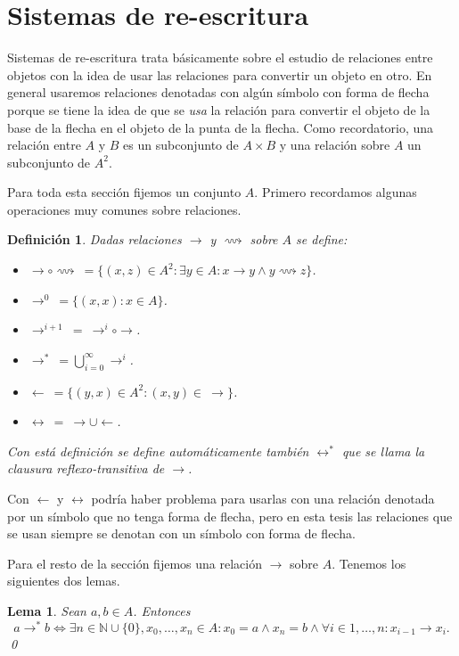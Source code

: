 \documentclass[12pt]{report}
\theoremstyle{customstyle}
\newtheorem{definition}[theorem]{Definición}
\newtheorem{lemma}[theorem]{Lema}
\theoremstyle{factstyle}
\begin{document}
\section{Sistemas de re-escritura}

Sistemas de re-escritura trata básicamente sobre el estudio de relaciones entre objetos con la idea de usar las relaciones para convertir un objeto en otro. En general usaremos relaciones denotadas con algún símbolo con forma de flecha porque se tiene la idea de que se \textsl{usa} la relación para convertir el objeto de la base de la flecha en el objeto de la punta de la flecha. Como recordatorio, una relación entre $A$ y $B$ es un subconjunto de $A × B$ y una relación sobre $A$ un subconjunto de $A^2$.

Para toda esta sección fijemos un conjunto $A$. Primero recordamos algunas operaciones muy comunes sobre relaciones.

\begin{definition}\label{def:operaciones relaciones}
  Dadas relaciones $→$ y $⟿$ sobre $A$ se define:
  \begin{itemize}
    \item $→ ∘ ⟿\ = \{(x, z) ∈ A^2 : ∃y ∈ A : x → y ∧ y ⟿ z\}$.
    \item $→^0\ = \{(x, x) : x ∈ A\}$.
    \item $→^{i + 1}\ =\ →^i ∘ →$.
    \item $→^*\ = ⋃_{i = 0}^∞ →^i$.
    \item $←\ = \{(y, x) ∈ A^2 : (x, y) ∈\ →\}$.
    \item $↔\ =\ → ∪ ←$.
  \end{itemize}

  Con está definición se define automáticamente también $↔^*$ que se llama la clausura reflexo-transitiva de $→$.
\end{definition}

Con $←$ y $↔$ podría haber problema para usarlas con una relación denotada por un símbolo que no tenga forma de flecha, pero en esta tesis las relaciones que se usan siempre se denotan con un símbolo con forma de flecha.

Para el resto de la sección fijemos una relación $→$ sobre $A$. Tenemos los siguientes dos lemas.

\begin{lemma}\label{lemma:→* como ∃}
  Sean $a, b ∈ A$. Entonces
  \[ a →^* b ⇔ ∃n ∈ ℕ ∪ \{0\}, x_0, …, x_n ∈ A : x_0 = a ∧ x_n = b ∧ ∀i ∈ {1, …, n} : x_{i-1} → x_i \text{.}\]
  \qed
\end{lemma}
\end{document}
